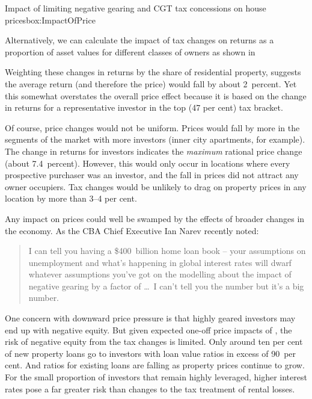 \documentclass{grattan}\usepackage[]{graphicx}\usepackage[]{color}
\begin{document}
\begin{bigbox*}{Impact of limiting negative gearing {and CGT} tax concessions on house prices}{box:ImpactOfPrice}
\begin{table}[H]
{}
\vspace*{5.5pt}

\end{table}
Alternatively, we can calculate the impact of tax changes on returns as a proportion of asset values for different classes of owners as shown in

Weighting these changes in returns by the share of residential property, suggests the average return (and therefore the price) would fall by about 2~percent. Yet this somewhat overstates the overall price effect because it is based on the change in returns for a representative investor in the top (47 per cent) tax bracket.

Of course, price changes would not be uniform. Prices would fall by more in the segments of the market with more investors (inner city apartments, for example). The change in returns for investors indicates the \emph{maximum} rational price change (about 7.4~percent). However, this would only occur in locations where every prospective purchaser was an investor, and the fall in prices did not attract any owner occupiers. Tax changes would be unlikely to drag on property prices in any location by more than 3--4 per cent.

\end{bigbox*}

Any impact on prices could well be swamped by the effects of broader changes in the economy. As the CBA Chief Executive Ian Narev recently noted:

\begin{quote}
I can tell you having a \$400~billion home loan book -- your assumptions on unemployment and what's happening in global interest rates will dwarf whatever assumptions you've got on the modelling about the impact of negative gearing by a factor of \dots\ I can't tell you the number but it's a big number.
\end{quote}

One concern with downward price pressure is that highly geared investors may end up with negative equity. But given expected one-off price impacts of ,  the risk of negative equity from the tax changes is limited. Only around ten per cent of new property loans go to investors with loan value ratios in excess of 90~per cent.   And ratios for existing loans are falling as property prices continue to grow. For the small proportion of investors that remain highly leveraged, higher interest rates pose a far greater risk than changes to the tax treatment of rental losses.   
\end{document}
